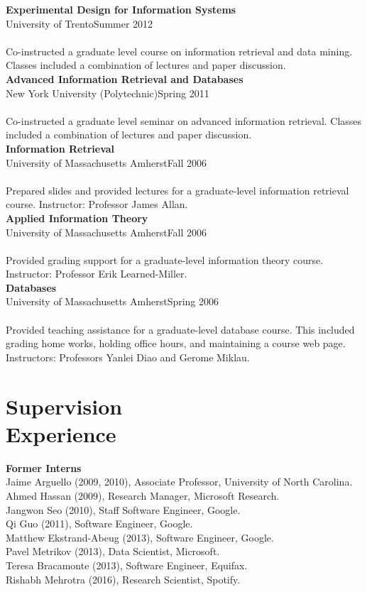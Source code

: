 \documentclass{article}
\begin{document}
\noindent\textbf{Experimental Design for Information Systems} \\
University of Trento\hfill Summer 2012\\\\
Co-instructed a graduate level course on information retrieval and data mining.  Classes included a combination of lectures and paper discussion. \\

\noindent\textbf{Advanced Information Retrieval and Databases} \\
New York University (Polytechnic)\hfill Spring 2011\\\\
Co-instructed a graduate level seminar on advanced information retrieval.  Classes included a combination of lectures and paper discussion. \\

\noindent\textbf{Information Retrieval} \\
University of Massachusetts Amherst\hfill Fall 2006\\\\
Prepared slides and provided lectures for a graduate-level information retrieval course. Instructor: Professor James Allan.\\

\noindent\textbf{Applied Information Theory} \\
University of Massachusetts Amherst\hfill Fall 2006\\\\
Provided grading support for a graduate-level information theory course. Instructor: Professor Erik Learned-Miller.\\

\noindent\textbf{Databases} \\
University of Massachusetts Amherst\hfill Spring 2006\\\\
Provided teaching assistance for a graduate-level database course. This included grading home works, holding office hours, and maintaining a course web page. Instructors: Professors Yanlei Diao and Gerome Miklau.

\section{Supervision\\Experience}\noindent\textbf{Former Interns}\\
Jaime Arguello (2009, 2010), Associate Professor, University of North Carolina.\\
Ahmed Hassan (2009), Research Manager, Microsoft Research.\\
Jangwon Seo (2010), Staff Software Engineer, Google.\\
Qi Guo (2011), Software Engineer, Google.\\
Matthew Ekstrand-Abeug (2013), Software Engineer, Google.\\
Pavel Metrikov (2013), Data Scientist, Microsoft.\\
Teresa Bracamonte (2013), Software Engineer, Equifax.\\
Rishabh Mehrotra (2016),  Research Scientist, Spotify.\\
\end{document}
